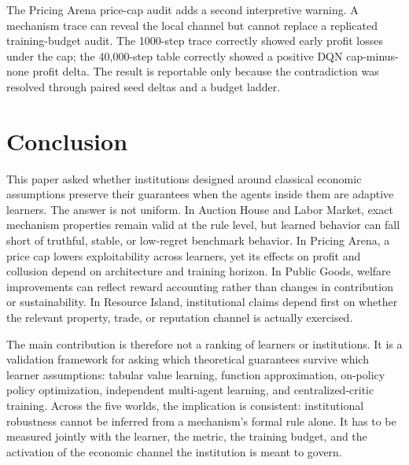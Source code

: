 \documentclass[11pt]{article}
\begin{document}
The Pricing Arena price-cap audit adds a second interpretive warning. A
mechanism trace can reveal the local channel but cannot replace a replicated
training-budget audit. The 1000-step trace correctly showed early profit losses
under the cap; the 40,000-step table correctly showed a positive DQN
cap-minus-none profit delta. The result is reportable only because the
contradiction was resolved through paired seed deltas and a budget ladder.

\section{Conclusion}

This paper asked whether institutions designed around classical economic
assumptions preserve their guarantees when the agents inside them are adaptive
learners. The answer is not uniform. In Auction House and Labor Market, exact
mechanism properties remain valid at the rule level, but learned behavior can
fall short of truthful, stable, or low-regret benchmark behavior. In Pricing
Arena, a price cap lowers exploitability across learners, yet its effects on
profit and collusion depend on architecture and training horizon. In Public
Goods, welfare improvements can reflect reward accounting rather than changes
in contribution or sustainability. In Resource Island, institutional claims
depend first on whether the relevant property, trade, or reputation channel is
actually exercised.

The main contribution is therefore not a ranking of learners or institutions.
It is a validation framework for asking which theoretical guarantees survive
which learner assumptions: tabular value learning, function approximation,
on-policy policy optimization, independent multi-agent learning, and
centralized-critic training. Across the five worlds, the implication is
consistent: institutional robustness cannot be inferred from a mechanism's
formal rule alone. It has to be measured jointly with the learner, the metric,
the training budget, and the activation of the economic channel the institution
is meant to govern.



\end{document}
